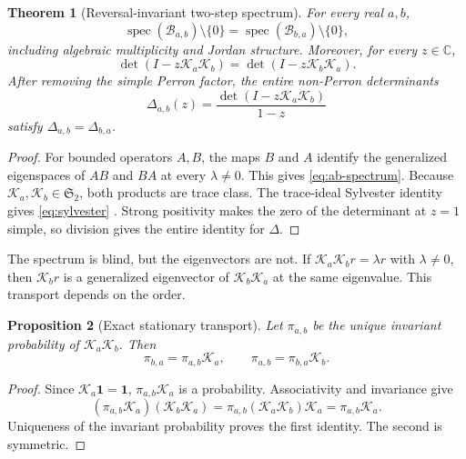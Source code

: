 \documentclass[11pt]{article}
\newtheorem{theorem}{Theorem}[section]
\newtheorem{proposition}[theorem]{Proposition}
\theoremstyle{definition}
\theoremstyle{remark}
\newcommand{\C}{\mathbb C}
\newcommand{\cK}{\mathcal K}
\newcommand{\cB}{\mathcal B}
\newcommand{\spec}{\operatorname{spec}}
\newcommand{\one}{\mathbf 1}
\begin{document}
\begin{theorem}[Reversal-invariant two-step spectrum]
\label{thm:ab-ba}
For every real $a,b$,
\begin{equation}\label{eq:ab-spectrum}
 \spec(\cB_{a,b})\setminus\{0\}
 =\spec(\cB_{b,a})\setminus\{0\},
\end{equation}
including algebraic multiplicity and Jordan structure.  Moreover, for every
$z\in\C$,
\begin{equation}\label{eq:sylvester}
 \det(I-z\cK_a\cK_b)=\det(I-z\cK_b\cK_a).
\end{equation}
After removing the simple Perron factor, the entire non-Perron determinants
\begin{equation}\label{eq:two-step-centered-det}
 \Delta_{a,b}(z)=\frac{\det(I-z\cK_a\cK_b)}{1-z}
\end{equation}
satisfy $\Delta_{a,b}=\Delta_{b,a}$.
\end{theorem}

\begin{proof}
For bounded operators $A,B$, the maps $B$ and $A$ identify the generalized
eigenspaces of $AB$ and $BA$ at every $\lambda\ne0$.  This gives
\eqref{eq:ab-spectrum}.  Because $\cK_a,\cK_b\in\mathfrak S_2$, both products
are trace class.  The trace-ideal Sylvester identity gives
\eqref{eq:sylvester} \citep{GohbergEtAl2000,Simon2005}.  Strong positivity
makes the zero of the determinant at $z=1$ simple, so division gives the
entire identity for $\Delta$.
\end{proof}

The spectrum is blind, but the eigenvectors are not.  If
$\cK_a\cK_b r=\lambda r$ with $\lambda\ne0$, then $\cK_b r$ is a generalized
eigenvector of $\cK_b\cK_a$ at the same eigenvalue.  This transport depends on
the order.

\begin{proposition}[Exact stationary transport]
\label{prop:stationary-transport}
Let $\pi_{a,b}$ be the unique invariant probability of $\cK_a\cK_b$.  Then
\begin{equation}\label{eq:stationary-transport}
 \pi_{b,a}=\pi_{a,b}\cK_a,
 \qquad
 \pi_{a,b}=\pi_{b,a}\cK_b.
\end{equation}
\end{proposition}

\begin{proof}
Since $\cK_a\one=\one$, $\pi_{a,b}\cK_a$ is a probability.  Associativity and
invariance give
\[
 (\pi_{a,b}\cK_a)(\cK_b\cK_a)
 =\pi_{a,b}(\cK_a\cK_b)\cK_a
 =\pi_{a,b}\cK_a.
\]
Uniqueness of the invariant probability proves the first identity.  The
second is symmetric.
\end{proof}
\end{document}
